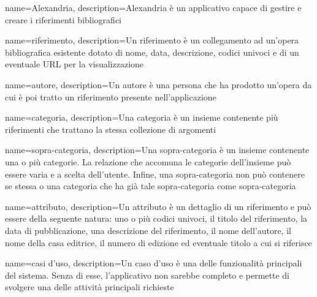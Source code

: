 
{
    name={Alexandria},
    description={Alexandria è un applicativo capace di gestire e creare i riferimenti bibliografici}
}

{
    name={riferimento},
    description={Un riferimento è un collegamento ad un'opera bibliografica esistente dotato di nome, data, descrizione, codici univoci e di un eventuale URL per la visualizzazione}
}

{
    name={autore},
    description={Un autore è una persona che ha prodotto un'opera da cui è poi tratto un riferimento presente nell'applicazione}
}

{
    name={categoria},
    description={Una categoria è un insieme contenente più riferimenti che trattano la stessa collezione di argomenti}
}

{
    name={sopra-categoria},
    description={Una sopra-categoria è un insieme contenente una o più categorie. La relazione che accomuna le categorie dell'insieme può essere varia e a scelta dell'utente. Infine, una sopra-categoria non può contenere se stessa o una categoria che ha già tale sopra-categoria come sopra-categoria}
}

{
    name={attributo},
    description={Un attributo è un dettaglio di un riferimento e può essere della seguente natura: uno o più codici univoci, il titolo del riferimento, la data di pubblicazione, una descrizione del riferimento, il nome dell'autore, il nome della casa editrice, il numero di edizione ed eventuale titolo a cui si riferisce}
}

{
    name={casi d'uso},
    description={Un caso d'uso è una delle funzionalità principali del sistema. Senza di esse, l'applicativo non sarebbe completo e permette di svolgere una delle attività principali richieste}
}


\printglossaries

